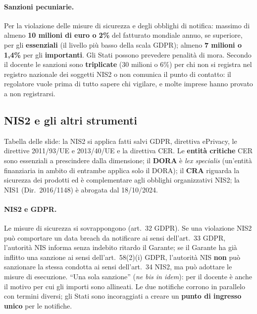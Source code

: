 \paragraph{Sanzioni pecuniarie.} Per la violazione delle misure di sicurezza e degli obblighi di
notifica: massimo di almeno \textbf{10 milioni di euro o 2\%} del fatturato mondiale annuo, se
superiore, per gli \textbf{essenziali} (il livello più basso della scala GDPR); almeno \textbf{7
milioni o 1,4\%} per gli \textbf{importanti}. Gli Stati possono prevedere penalità di mora. Secondo il
docente le sanzioni sono \textbf{triplicate} (30 milioni o 6\%) per chi non si registra nel registro
nazionale dei soggetti NIS2 o non comunica il punto di contatto: il regolatore vuole prima di tutto
sapere chi vigilare, e molte imprese hanno provato a non registrarsi.

\subsection{NIS2 e gli altri strumenti}
Tabella delle slide: la NIS2 si applica fatti salvi GDPR, direttiva ePrivacy, le direttive 2011/93/UE e
2013/40/UE e la direttiva CER. Le \textbf{entità critiche} CER sono essenziali a prescindere dalla
dimensione; il \textbf{DORA} è \emph{lex specialis} (un'entità finanziaria in ambito di entrambe applica
solo il DORA); il \textbf{CRA} riguarda la sicurezza dei prodotti ed è complementare agli obblighi
organizzativi NIS2; la NIS1 (Dir.~2016/1148) è abrogata dal 18/10/2024.

\paragraph{NIS2 e GDPR.} Le misure di sicurezza si sovrappongono (art.~32 GDPR). Se una violazione NIS2
può comportare un data breach da notificare ai sensi dell'art.~33 GDPR, l'autorità NIS informa senza
indebito ritardo il Garante; se il Garante ha già inflitto una sanzione ai sensi dell'art.~58(2)(i)
GDPR, l'autorità NIS \textbf{non} può sanzionare la stessa condotta ai sensi dell'art.~34 NIS2, ma può
adottare le misure di esecuzione. ``Una sola sanzione'' (\emph{ne bis in idem}): per il docente è anche
il motivo per cui gli importi sono allineati. Le due notifiche corrono in parallelo con termini
diversi; gli Stati sono incoraggiati a creare un \textbf{punto di ingresso unico} per le notifiche.

